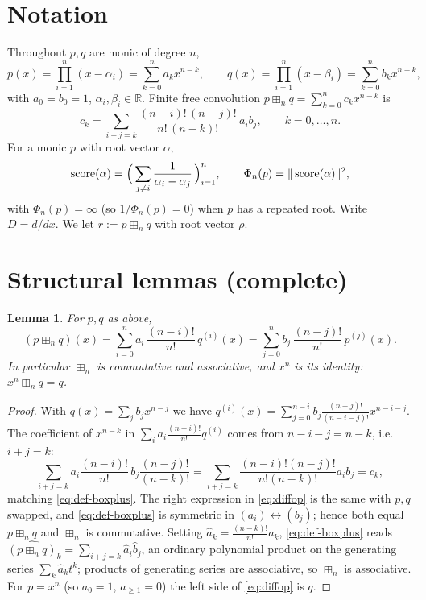 \documentclass[12pt]{article}
\newtheorem{lemma}{Lemma}
\theoremstyle{definition}
\DeclareMathOperator{\score}{score}
\newcommand{\bR}{\mathbb{R}}
\newcommand{\boxp}{\boxplus_n}
\begin{document}
\section{Notation}

Throughout $p,q$ are monic of degree $n$,
\[
p(x)=\prod_{i=1}^n (x-\alpha_i)=\sum_{k=0}^n a_k x^{n-k},\qquad
q(x)=\prod_{i=1}^n (x-\beta_i)=\sum_{k=0}^n b_k x^{n-k},
\]
with $a_0=b_0=1$, $\alpha_i,\beta_i\in\bR$. Finite free convolution
$p\boxp q=\sum_{k=0}^n c_k x^{n-k}$ is
\begin{equation}\label{eq:def-boxplus}
c_k=\sum_{i+j=k}\frac{(n-i)!\,(n-j)!}{n!\,(n-k)!}\,a_i b_j ,\qquad k=0,\dots,n .
\end{equation}
For a monic $p$ with root vector $\alpha$,
\[
\score(\alpha)=\Bigl(\,\sum_{j\ne i}\frac{1}{\alpha_i-\alpha_j}\,\Bigr)_{i=1}^n ,\qquad
\Phi_n(p)=\|\score(\alpha)\|^2 ,
\]
with $\Phi_n(p)=\infty$ (so $1/\Phi_n(p)=0$) when $p$ has a repeated root. Write $D=d/dx$.
We let $r:=p\boxp q$ with root vector $\rho$.

\section{Structural lemmas (complete)}\label{sec:structure}

\begin{lemma}\label{lem:diffop}
For $p,q$ as above,
\begin{equation}\label{eq:diffop}
(p\boxp q)(x)=\sum_{i=0}^{n} a_i\,\frac{(n-i)!}{n!}\,q^{(i)}(x)
            =\sum_{j=0}^{n} b_j\,\frac{(n-j)!}{n!}\,p^{(j)}(x).
\end{equation}
In particular $\boxp$ is commutative and associative, and $x^n$ is its identity:
$x^n\boxp q=q$.
\end{lemma}

\begin{proof}
With $q(x)=\sum_{j} b_j x^{n-j}$ we have
$q^{(i)}(x)=\sum_{j=0}^{n-i} b_j\frac{(n-j)!}{(n-i-j)!}x^{n-i-j}$. The coefficient of
$x^{n-k}$ in $\sum_i a_i\frac{(n-i)!}{n!}q^{(i)}$ comes from $n-i-j=n-k$, i.e.\ $i+j=k$:
\[
\sum_{i+j=k}a_i\frac{(n-i)!}{n!}\,b_j\frac{(n-j)!}{(n-k)!}
=\sum_{i+j=k}\frac{(n-i)!(n-j)!}{n!(n-k)!}a_i b_j=c_k,
\]
matching \eqref{eq:def-boxplus}. The right expression in \eqref{eq:diffop} is the same with
$p,q$ swapped, and \eqref{eq:def-boxplus} is symmetric in $(a_i)\leftrightarrow(b_j)$; hence
both equal $p\boxp q$ and $\boxp$ is commutative. Setting $\hat a_k=\frac{(n-k)!}{n!}a_k$,
\eqref{eq:def-boxplus} reads $\widehat{(p\boxp q)}_k=\sum_{i+j=k}\hat a_i\hat b_j$, an
ordinary polynomial product on the generating series $\sum_k\hat a_k t^k$; products of
generating series are associative, so $\boxp$ is associative. For $p=x^n$ (so $a_0=1$,
$a_{\ge1}=0$) the left side of \eqref{eq:diffop} is $q$.
\end{proof}
\end{document}
